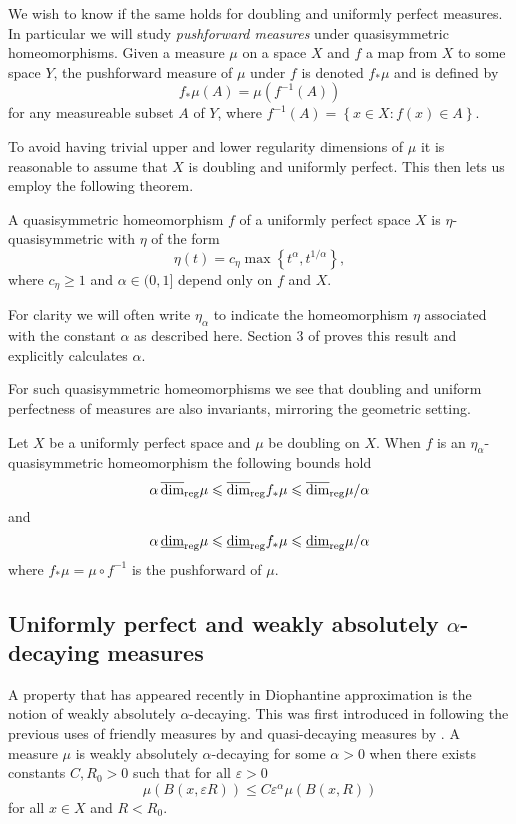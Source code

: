 We wish to know if the same holds for doubling and uniformly perfect measures. In particular we will study \textit{pushforward measures} under quasisymmetric homeomorphisms. Given a measure $\mu$ on a space $X$ and $f$ a map from $X$ to some space $Y$, the pushforward measure of $\mu$ under $f$ is denoted $f_*\mu$ and is defined by
\[
f_*\mu (A) = \mu(f^{-1}(A))
\]
for any measureable subset $A$ of $Y$, where $f^{-1}(A) = \left\{x \in X \colon f(x) \in A \right\}$. 

To avoid having trivial upper and lower regularity dimensions of $\mu$ it is reasonable to assume that $X$ is doubling and uniformly perfect. This then lets us employ the following theorem. 

\begin{theorem}
	A quasisymmetric homeomorphism $f$ of a uniformly perfect space $X$ is $\eta$-quasisymmetric with $\eta$ of the form
	\[
	\eta(t) = c_\eta \max\left\{t^\alpha, t^{1/\alpha}\right\},
	\]
	where $c_\eta \ge 1 $ and $\alpha \in (0,1]$ depend only on $f$ and $X$.
\end{theorem}
For clarity we will often write $\eta_{\alpha}$ to indicate the homeomorphism $\eta$ associated with the constant $\alpha$ as described here. Section 3 of \cite{tukia-vaisala} proves this result and explicitly calculates $\alpha$. 

For such quasisymmetric homeomorphisms we see that doubling and uniform perfectness of measures are also invariants, mirroring the geometric setting.

\begin{theorem}\label{ch-quantifying:quaisymm-thm}
	Let $X$ be a uniformly perfect space and $\mu$ be doubling on $X$. When $f$ is an $\eta_\alpha$-quasisymmetric homeomorphism the following bounds hold
	\[
	\alpha \, \overline{\dim}_{\textup{reg}} \mu \leqslant \overline{\dim}_{\textup{reg}} f_{*}\mu \leqslant \overline{\dim}_{\textup{reg}} \mu/\alpha
	\]
	and 
	\[
	\alpha \, \underline{\dim}_{\textup{reg}} \mu \leqslant \underline{\dim}_{\textup{reg}} f_{*}\mu \leqslant \underline{\dim}_{\textup{reg}} \mu/\alpha
	\]
	where $f_{*}\mu = \mu \circ f^{-1}$ is the pushforward of $\mu$.
\end{theorem}



\subsection{Uniformly perfect and weakly absolutely $\alpha$-decaying measures}\label{ch-quantifying:sec:diophantine}

A property that has appeared recently in Diophantine approximation is the notion of weakly absolutely $\alpha$-decaying. This was first introduced in \cite{beres-sanju-al} following the previous uses of friendly measures by \cite{friendly} and quasi-decaying measures by \cite{decaying1, decaying2}. A measure $\mu$ is weakly absolutely $\alpha$-decaying for some $\alpha > 0$ when there exists constants $C, R_0 >0$ such that for all $\varepsilon > 0$
\[
\mu(B(x,\varepsilon R)) \le C \varepsilon^{\alpha} \mu(B(x,R))
\]
for all $x \in X$ and $R<R_0$.

